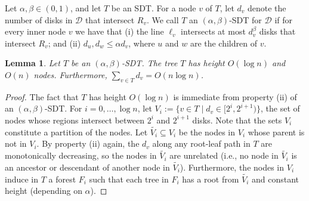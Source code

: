 \documentclass{paper}
\newcommand {\eqdef}{:=}
\newcommand {\script} [1] {\ensuremath {\mathcal {#1}}}
\newcommand {\D} {\script {D}}
\newtheorem{lemma}[theorem]{Lemma}
\begin{document}
Let $\alpha, \beta \in (0,1)$, and let $T$ be an SDT.
For a node $v$ of $T$, let $d_v$ denote the number of disks in $\D$ that
intersect $R_v$. We call $T$ an $(\alpha, \beta)$-SDT
for $\D$ if for every inner node $v$ we have that
(i) the line $\ell_v$ intersects at most $d_v^\beta$ disks that intersect
$R_v$; and (ii) $d_u, d_w \leq \alpha d_v$, where $u$ and $w$ are the children
of $v$.


\begin{lemma}\label{lem:tree_complexity}
Let $T$ be an $(\alpha, \beta)$-SDT. The tree $T$ has height $O(\log n)$ and
$O(n)$ nodes.
Furthermore, $\sum_{v\in T} d_v = O(n \log n)$.
\end{lemma}

\begin{proof}
The fact that $T$ has height $O(\log n)$ is immediate from property
(ii) of an $(\alpha, \beta)$-SDT.
For $i = 0, \dots, \log n$, let 
$V_i \eqdef \{v \in T \mid d_v \in [2^i, 2^{i+1})\}$, the set of nodes
whose regions intersect between $2^i$ and $2^{i+1}$ disks.
Note that the sets $V_i$ constitute a partition of the nodes.
Let $\widetilde{V_i} \subseteq V_i$ be the nodes in $V_i$ whose parent
is not in $V_i$. By property (ii) again, the $d_v$ 
along any root-leaf path in $T$ are monotonically decreasing, so the nodes in 
$\widetilde{V_i}$ are unrelated (i.e., no node in $\widetilde{V_i}$ is 
an ancestor or descendant of another node in 
$\widetilde{V_i}$). 
Furthermore, the nodes in $V_i$ induce in $T$ a forest $F_i$ such 
that each tree in $F_i$ has a root from $\widetilde{V_i}$ and 
constant height (depending on $\alpha$).


\end{proof}
\end{document}
